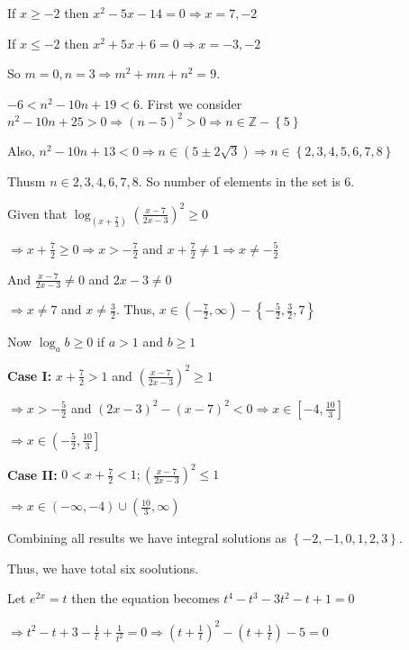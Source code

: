   If $x\geq -2$ then $x^2 - 5x - 14 = 0 \Rightarrow x = 7, -2$

  If $x\leq -2$ then $x^2 + 5x + 6 = 0 \Rightarrow x = -3, -2$

  So $m = 0, n = 3\Rightarrow m^2 + mn + n^2 = 9$.
\item $-6 < n^2 - 10n + 19 < 6$. First we consider $n^2 - 10n + 25 > 0 \Rightarrow (n - 5)^2 > 0\Rightarrow
  n\in\mathbb{Z} - \left\{5\right\}$

  Also, $n^2 - 10n + 13 < 0 \Rightarrow n\in\left(5\pm2\sqrt{3}\right)\Rightarrow n\in\left\{2, 3, 4, 5, 6,
  7, 8\right\}$

  Thusm $n\in{2, 3, 4, 6, 7, 8}$. So number of elements in the set is $6$.
\item Given that $\log_{\left(x + \frac{7}{2}\right)}\left(\frac{x - 7}{2x - 3}\right)^2\geq 0$

  $\Rightarrow x + \frac{7}{2}\geq 0 \Rightarrow x > -\frac{7}{2}$ and $x + \frac{7}{2}\neq 1 \Rightarrow
  x\neq -\frac{5}{2}$

  And $\frac{x - 7}{2x - 3}\neq 0$ and $2x - 3\neq 0$

  $\Rightarrow x\neq 7$ and $x\neq \frac{3}{2}$. Thus, $x\in\left(-\frac{7}{2}, \infty\right)
  - \left\{-\frac{5}{2}, \frac{3}{2}, 7\right\}$

  Now $\log_ab\geq 0$ if $a > 1$ and $b\geq 1$

  {\bf Case I:} $x + \frac{7}{2} > 1$ and $\left(\frac{x - 7}{2x - 3}\right)^2\geq 1$

  $\Rightarrow x > -\frac{5}{2}$ and $(2x - 3)^2 - (x - 7)^2 < 0 \Rightarrow
  x\in\left[-4, \frac{10}{3}\right]$

  $\Rightarrow x\in\left(-\frac{5}{2}, \frac{10}{3}\right]$

  {\bf Case II:} $0 < x + \frac{7}{2}  < 1; \left(\frac{x - 7}{2x - 3}\right)^2\leq 1$

  $\Rightarrow x\in\left(-\infty, -4\right)\cup \left(\frac{10}{3}, \infty\right)$

  Combining all results we have integral solutions as $\left\{-2, -1, 0, 1, 2, 3\right\}$.

  Thus, we have total six soolutions.
\item Let $e^{2x} = t$ then the equation becomes $t^4 - t^3 -3t^2 - t + 1 = 0$

  $\Rightarrow t^2 - t + 3 - \frac{1}{t} + \frac{1}{t^2} = 0 \Rightarrow \left(t  + \frac{1}{t}\right)^2
  - \left(t + \frac{1}{t}\right) - 5 = 0$

